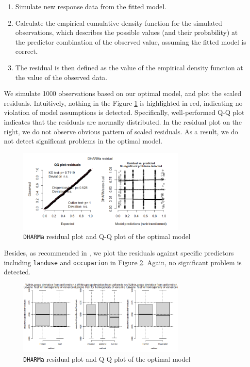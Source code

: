 \documentclass[11pt,twoside]{article}
\numberwithin{Theorem}{section}
\numberwithin{Definition}{section}
\numberwithin{Lemma}{section}
\numberwithin{Algorithm}{section}
\numberwithin{equation}{section}
\begin{document}
\begin{enumerate}
	\item Simulate new response data from the fitted model.
	\item Calculate the empirical cumulative density function for the simulated observations, which describes the possible values (and their probability) at the predictor combination of the observed value, assuming the fitted model is correct.
	\item The residual is then defined as the value of the empirical density function at the value of the observed data.
\end{enumerate}

We simulate 1000 observations based on our optimal model, and plot the scaled residuals. Intuitively, nothing in the Figure \ref{fig:diagnosis1} is highlighted in red, indicating no violation of model assumptions is detected. Specifically, well-performed Q-Q plot indicates that the residuals are normally distributed. In the residual plot on the right, we do not observe obvious pattern of scaled residuals. As a result, we do not detect significant problems in the optimal model.

\begin{figure}[!h]
	\centering
	\includegraphics[width = 0.75\textwidth]{Images/diagnosis1.png}
	\caption{\texttt{DHARMa} residual plot and Q-Q plot of the optimal model}
	\label{fig:diagnosis1}
\end{figure}

Besides, as recommended in \cite{dharma}, we plot the residuals against specific predictors including \texttt{landuse} and \texttt{occuparion} in Figure \ref{fig:diagnosis2}. Again, no significant problem is detected.

\begin{figure}[!h]
	\centering
	\includegraphics[width = 0.75\textwidth]{Images/diagnosis2.png}
	\caption{\texttt{DHARMa} residual plot and Q-Q plot of the optimal model}
	\label{fig:diagnosis2}
\end{figure}
\end{document}

